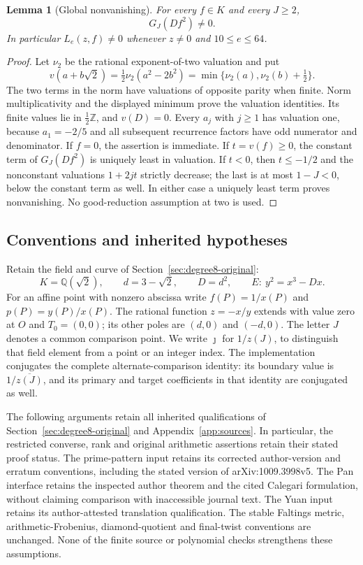 \documentclass[11pt]{article}
\newtheorem{lemma}[theorem]{Lemma}
\theoremstyle{definition}
\theoremstyle{remark}
\newcommand{\Q}{\mathbb Q}
\newcommand{\Z}{\mathbb Z}
\begin{document}
\begin{lemma}[Global nonvanishing]
\label{lem:quartic-reciprocal-nonzero}
For every $f\in K$ and every $J\ge2$,
\[
                 G_J(Df^2)\ne0.
\]
In particular $L_e(z,f)\ne0$ whenever $z\ne0$ and $10\le e\le64$.
\end{lemma}
\begin{proof}
Let $\nu_2$ be the rational exponent-of-two valuation and put
\[
 v(a+b\sqrt2)=\tfrac12\nu_2(a^2-2b^2)
             =\min\{\nu_2(a),\nu_2(b)+\tfrac12\}.
\]
The two terms in the norm have valuations of opposite parity when finite.
Norm multiplicativity and the displayed minimum prove the valuation
identities. Its finite values lie in $\tfrac12\Z$, and $v(D)=0$.
Every $a_j$ with $j\ge1$ has valuation one, because $a_1=-2/5$ and
all subsequent recurrence factors have odd numerator and denominator.
If $f=0$, the assertion is immediate. If $t=v(f)\ge0$, the constant
term of $G_J(Df^2)$ is uniquely least in valuation. If $t<0$, then
$t\le-1/2$ and the nonconstant valuations $1+2jt$ strictly decrease;
the last is at most $1-J<0$, below the constant term as well. In either
case a uniquely least term proves nonvanishing. No good-reduction
assumption at two is used.
\end{proof}

\subsection{Conventions and inherited hypotheses}
\label{sec:v4-inherited}

Retain the field and curve of Section~\ref{sec:degree8-original}:
\[
 K=\Q(\sqrt2),\qquad d=3-\sqrt2,\qquad D=d^2,
 \qquad E:\ y^2=x^3-Dx.
\]
For an affine point with nonzero abscissa write $f(P)=1/x(P)$ and
$p(P)=y(P)/x(P)$. The rational function $z=-x/y$ extends with value zero
at $O$ and $T_0=(0,0)$; its other poles are $(d,0)$ and $(-d,0)$.
The letter $J$ denotes a common comparison point. We write $\jmath$ for
$1/z(J)$, to distinguish that field element from a point or an integer index.
The implementation conjugates the complete alternate-comparison identity:
its boundary value is $1/\overline{z(J)}$, and its primary and target
coefficients in that identity are conjugated as well.

The following arguments retain all inherited qualifications of
Section~\ref{sec:degree8-original} and Appendix~\ref{app:sources}. In particular, the restricted converse, rank and original
arithmetic assertions retain their stated proof status. The prime-pattern
input retains its corrected author-version and erratum conventions,
including the stated version of arXiv:1009.3998v5. The Pan interface retains
the inspected author theorem and the cited Calegari formulation, without
claiming comparison with inaccessible journal text. The Yuan input retains
its author-attested translation qualification. The stable Faltings metric,
arithmetic-Frobenius, diamond-quotient and final-twist conventions are
unchanged. None of the finite source or polynomial checks strengthens these
assumptions.
\end{document}
